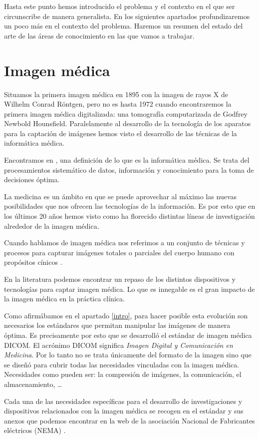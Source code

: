 Hasta este punto hemos introducido el problema y el contexto en el que ser circunscribe de manera generalista. En los siguientes apartados profundizaremos un poco más en el contexto del problema. Haremos un resumen del estado del arte de las áreas de conocimiento en las que vamos a trabajar. \medskip\par

\section{Imagen médica}
Situamos la primera imagen médica en 1895 con la imagen de rayos X de  Wilhelm Conrad Röntgen, pero no es hasta 1972 cuando encontraremos la primera imagen médica digitalizada: una tomografía computarizada de Godfrey Newbold Hounsfield. Paralelamente al desarrollo de la tecnología de los aparatos para la captación de imágenes hemos visto el desarrollo de las técnicas de la informática médica.\par
Encontramos en \cite{mantas2010recommendations}, una definición de lo que es la informática médica. Se trata del procesamientos sistemático de datos, información y conocimiento para la toma de decisiones óptima.\par
La medicina es un ámbito en que se puede aprovechar al máximo las nuevas posibilidades que nos ofrecen las tecnologías de la información. Es por esto que en los últimos 20 años hemos visto como ha florecido distintas líneas de investigación alrededor de la imagen médica.\par
Cuando hablamos de imagen médica nos referimos a un conjunto de técnicas y procesos para capturar imágenes  totales o parciales del cuerpo humano con propósitos cínicos \cite{wiki:imgmedica}.\par

En la literatura \cite{Muller20041,Maintz19981} podemos encontrar un repaso de los distintos dispositivos y tecnologías para captar imagen médica. Lo que es innegable es el gran impacto de la imagen médica en la práctica clínica. \medskip \par

Como afirmábamos en el apartado \ref{intro}, para hacer posible esta evolución son necesarios los estándares que permitan manipular las imágenes de manera óptima. Es precisamente por esto que se desarrolló el estándar de imagen médica DICOM. 
El acrónimo DICOM significa \textit{Imagen Digital y Comunicación en Medicina}. Por lo tanto no se trata únicamente del formato de la imagen sino que se diseñó para cubrir todas las necesidades vinculadas con la imagen médica. Necesidades como pueden ser: la compresión de imágenes, la comunicación, el almacenamiento, \ldots\par
Cada una de las necesidades específicas para el desarrollo de investigaciones y dispositivos relacionados con la imagen médica se recogen en el estándar y sus anexos que podemos encontrar en la web de la asociación Nacional de Fabricantes eléctricos (NEMA) \cite{nema}.\medskip\par

